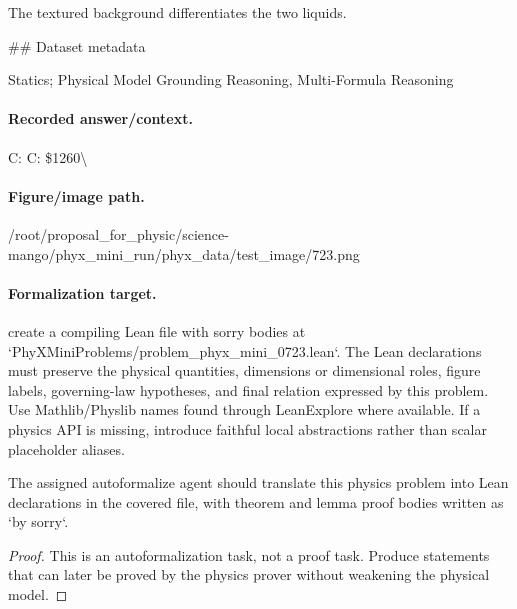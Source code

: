 The textured background differentiates the two liquids.

\#\# Dataset metadata

Statics; Physical Model Grounding Reasoning, Multi-Formula Reasoning

\paragraph{Recorded answer/context.}
C: C: \$1260\textbackslash{}

\paragraph{Figure/image path.}
/root/proposal\_for\_physic/science-mango/phyx\_mini\_run/phyx\_data/test\_image/723.png

\paragraph{Formalization target.}
create a compiling Lean file with sorry bodies at `PhyXMiniProblems/problem\_phyx\_mini\_0723.lean`. The Lean declarations must preserve the physical quantities, dimensions or dimensional roles, figure labels, governing-law hypotheses, and final relation expressed by this problem.
Use Mathlib/Physlib names found through LeanExplore where available. If a physics API is missing, introduce faithful local abstractions rather than scalar placeholder aliases.

\begin{theorem}
\label{thm:physics:phyx_mini_0723:target}
The assigned autoformalize agent should translate this physics problem into Lean declarations in the covered file, with theorem and lemma proof bodies written as `by sorry`.
\end{theorem}
\begin{proof}
This is an autoformalization task, not a proof task. Produce statements that can later be proved by the physics prover without weakening the physical model.
\end{proof}

